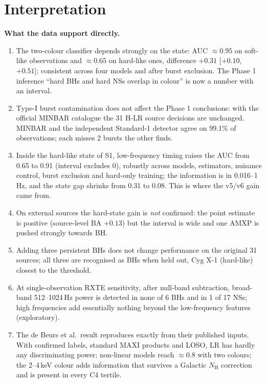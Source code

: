 \section{Interpretation}
\textbf{What the data support directly.}
\begin{enumerate}
\item The two-colour classifier depends strongly on the state: AUC $\approx0.95$ on soft-like observations and $\approx0.65$ on
hard-like ones, difference $+0.31$ [$+0.10$, $+0.51$]; consistent across four models and after burst exclusion. The Phase 1
inference ``hard BHs and hard NSs overlap in colour'' is now a number with an interval.
\item Type-I burst contamination does not affect the Phase 1 conclusions: with the official MINBAR catalogue the 31 H-LR source
decisions are unchanged. MINBAR and the independent Standard-1 detector agree on 99.1\% of observations; each misses 2 bursts the
other finds.
\item Inside the hard-like state of S1, low-frequency timing raises the AUC from 0.65 to 0.91 (interval excludes 0), robustly across
models, estimators, nuisance control, burst exclusion and hard-only training; the information is in 0.016--1\,Hz, and the state gap
shrinks from 0.31 to 0.08. This is where the v5/v6 gain came from.
\item On external sources the hard-state gain is \emph{not} confirmed: the point estimate is positive (source-level BA $+0.13$) but the
interval is wide and one AMXP is pushed strongly towards BH.
\item Adding three persistent BHs does not change performance on the original 31 sources; all three are recognised as BHs when held
out, Cyg X-1 (hard-like) closest to the threshold.
\item At single-observation RXTE sensitivity, after null-band subtraction, broad-band 512--1024\,Hz power is detected in none of 6 BHs and
in 1 of 17 NSs; high frequencies add essentially nothing beyond the low-frequency features (exploratory).
\item The de Beurs et al.\ result reproduces exactly from their published inputs. With confirmed labels, standard MAXI products and
LOSO, LR has hardly any discriminating power; non-linear models reach $\approx0.8$ with two colours; the 2--4\,keV colour adds
information that survives a Galactic $N_\mathrm{H}$ correction and is present in every C4 tertile.
\end{enumerate}

